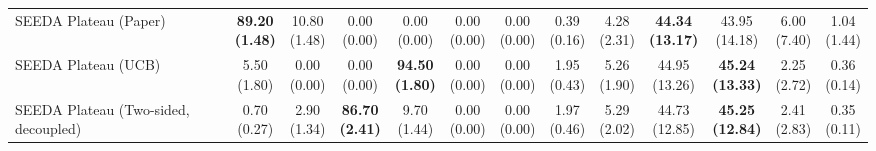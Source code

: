 \begin{table}[H]
{\begin{tabular}{l|cccccc|cccccc}
SEEDA Plateau (Paper) & \bfseries \makecell{89.20 \\ (1.48)} & \makecell{10.80 \\ (1.48)} & {\cellcolor[HTML]{C8E6C9}} \makecell{0.00 \\ (0.00)} & \makecell{0.00 \\ (0.00)} & \makecell{0.00 \\ (0.00)} & \makecell{0.00 \\ (0.00)} & \makecell{0.39 \\ (0.16)} & \makecell{4.28 \\ (2.31)} & {\cellcolor[HTML]{C8E6C9}} \bfseries \makecell{44.34 \\ (13.17)} & \makecell{43.95 \\ (14.18)} & \makecell{6.00 \\ (7.40)} & \makecell{1.04 \\ (1.44)} \\
SEEDA Plateau (UCB) & \makecell{5.50 \\ (1.80)} & \makecell{0.00 \\ (0.00)} & {\cellcolor[HTML]{C8E6C9}} \makecell{0.00 \\ (0.00)} & \bfseries \makecell{94.50 \\ (1.80)} & \makecell{0.00 \\ (0.00)} & \makecell{0.00 \\ (0.00)} & \makecell{1.95 \\ (0.43)} & \makecell{5.26 \\ (1.90)} & {\cellcolor[HTML]{C8E6C9}} \makecell{44.95 \\ (13.26)} & \bfseries \makecell{45.24 \\ (13.33)} & \makecell{2.25 \\ (2.72)} & \makecell{0.36 \\ (0.14)} \\
SEEDA Plateau (Two-sided, decoupled) & \makecell{0.70 \\ (0.27)} & \makecell{2.90 \\ (1.34)} & {\cellcolor[HTML]{C8E6C9}} \bfseries \makecell{86.70 \\ (2.41)} & \makecell{9.70 \\ (1.44)} & \makecell{0.00 \\ (0.00)} & \makecell{0.00 \\ (0.00)} & \makecell{1.97 \\ (0.46)} & \makecell{5.29 \\ (2.02)} & {\cellcolor[HTML]{C8E6C9}} \makecell{44.73 \\ (12.85)} & \bfseries \makecell{45.25 \\ (12.84)} & \makecell{2.41 \\ (2.83)} & \makecell{0.35 \\ (0.11)} \\

\end{tabular}}
\end{table}
